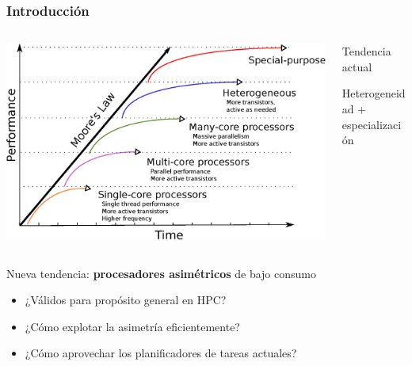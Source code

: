 \documentclass[10pt]{beamer}
\begin{document}
\begin{frame}
  \frametitle{Introducción}

  \vfill

  \begin{columns}
    \begin{column}{0.5\textwidth}
      \begin{center}
        \includegraphics[width=1.0\textwidth]{Figures/hofstee.eps}
      \end{center}      
    \end{column}
    \begin{column}{0.5\textwidth}
      \begin{block}{Tendencia actual}
        \begin{center}
          Heterogeneidad + especialización
        \end{center}
      \end{block}      
    \end{column}
  \end{columns}

  \vfill

  \begin{exampleblock}{Nueva tendencia: {\bf procesadores asimétricos} de bajo consumo}
    \begin{itemize}
    \item ¿Válidos para propósito general en HPC?
    \item ¿Cómo explotar la asimetría eficientemente?
    \item ¿Cómo aprovechar los planificadores de tareas actuales?
    \end{itemize}
  \end{exampleblock}

\end{frame}
\end{document}
